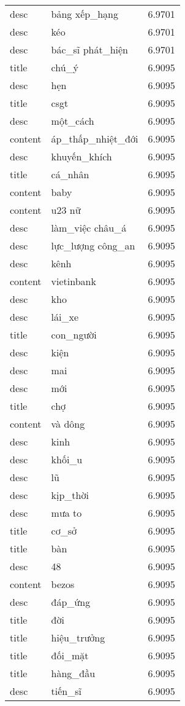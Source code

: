 \documentclass{article}
\begin{document}
\begin{tabular}{lll}
desc & bảng xếp\_hạng & 6.9701\\
desc & kéo & 6.9701\\
desc & bác\_sĩ phát\_hiện & 6.9701\\
title & chú\_ý & 6.9095\\
desc & hẹn & 6.9095\\
title & csgt & 6.9095\\
desc & một\_cách & 6.9095\\
content & áp\_thấp\_nhiệt\_đới & 6.9095\\
desc & khuyến\_khích & 6.9095\\
title & cá\_nhân & 6.9095\\
content & baby & 6.9095\\
content & u23 nữ & 6.9095\\
desc & làm\_việc châu\_á & 6.9095\\
desc & lực\_lượng công\_an & 6.9095\\
desc & kênh & 6.9095\\
content & vietinbank & 6.9095\\
desc & kho & 6.9095\\
desc & lái\_xe & 6.9095\\
title & con\_người & 6.9095\\
desc & kiện & 6.9095\\
desc & mai & 6.9095\\
desc & mới & 6.9095\\
title & chợ & 6.9095\\
content & và dông & 6.9095\\
desc & kinh & 6.9095\\
desc & khối\_u & 6.9095\\
desc & lũ & 6.9095\\
desc & kịp\_thời & 6.9095\\
desc & mưa to & 6.9095\\
title & cơ\_sở & 6.9095\\
title & bàn & 6.9095\\
desc & 48 & 6.9095\\
content & bezos & 6.9095\\
desc & đáp\_ứng & 6.9095\\
title & đời & 6.9095\\
title & hiệu\_trưởng & 6.9095\\
title & đối\_mặt & 6.9095\\
title & hàng\_đầu & 6.9095\\
desc & tiến\_sĩ & 6.9095\\

\end{tabular}
\end{document}
